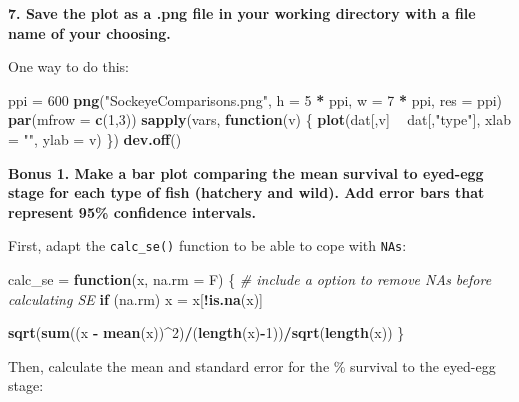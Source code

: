 \documentclass[]{book}
\newenvironment{Shaded}{\begin{snugshade}}{\end{snugshade}}
\newcommand{\KeywordTok}[1]{\textcolor[rgb]{0.13,0.29,0.53}{\textbf{#1}}}
\newcommand{\DataTypeTok}[1]{\textcolor[rgb]{0.13,0.29,0.53}{#1}}
\newcommand{\DecValTok}[1]{\textcolor[rgb]{0.00,0.00,0.81}{#1}}
\newcommand{\StringTok}[1]{\textcolor[rgb]{0.31,0.60,0.02}{#1}}
\newcommand{\CommentTok}[1]{\textcolor[rgb]{0.56,0.35,0.01}{\textit{#1}}}
\newcommand{\ControlFlowTok}[1]{\textcolor[rgb]{0.13,0.29,0.53}{\textbf{#1}}}
\newcommand{\OperatorTok}[1]{\textcolor[rgb]{0.81,0.36,0.00}{\textbf{#1}}}
\newcommand{\NormalTok}[1]{#1}
\theoremstyle{definition}
\theoremstyle{definition}
\theoremstyle{definition}
\theoremstyle{remark}
\begin{document}
\textbf{7. Save the plot as a .png file in your working directory with a
file name of your choosing.}

One way to do this:

\begin{Shaded}
\begin{Highlighting}[]
\NormalTok{ppi =}\StringTok{ }\DecValTok{600}
\KeywordTok{png}\NormalTok{(}\StringTok{"SockeyeComparisons.png"}\NormalTok{, }\DataTypeTok{h =} \DecValTok{5} \OperatorTok{*}\StringTok{ }\NormalTok{ppi, }\DataTypeTok{w =} \DecValTok{7} \OperatorTok{*}\StringTok{ }\NormalTok{ppi, }\DataTypeTok{res =}\NormalTok{ ppi)}
\KeywordTok{par}\NormalTok{(}\DataTypeTok{mfrow =} \KeywordTok{c}\NormalTok{(}\DecValTok{1}\NormalTok{,}\DecValTok{3}\NormalTok{))}
\KeywordTok{sapply}\NormalTok{(vars, }\ControlFlowTok{function}\NormalTok{(v) \{}
  \KeywordTok{plot}\NormalTok{(dat[,v] }\OperatorTok{~}\StringTok{ }\NormalTok{dat[,}\StringTok{"type"}\NormalTok{], }\DataTypeTok{xlab =} \StringTok{""}\NormalTok{, }\DataTypeTok{ylab =}\NormalTok{ v)}
\NormalTok{\})}
\KeywordTok{dev.off}\NormalTok{()}
\end{Highlighting}
\end{Shaded}

\textbf{Bonus 1. Make a bar plot comparing the mean survival to eyed-egg
stage for each type of fish (hatchery and wild). Add error bars that
represent 95\% confidence intervals.}

First, adapt the \texttt{calc\_se()} function to be able to cope with
\texttt{NAs}:

\begin{Shaded}
\begin{Highlighting}[]
\NormalTok{calc_se =}\StringTok{ }\ControlFlowTok{function}\NormalTok{(x, }\DataTypeTok{na.rm =}\NormalTok{ F) \{}
  \CommentTok{# include a option to remove NAs before calculating SE}
  \ControlFlowTok{if}\NormalTok{ (na.rm) x =}\StringTok{ }\NormalTok{x[}\OperatorTok{!}\KeywordTok{is.na}\NormalTok{(x)]}
  
  \KeywordTok{sqrt}\NormalTok{(}\KeywordTok{sum}\NormalTok{((x }\OperatorTok{-}\StringTok{ }\KeywordTok{mean}\NormalTok{(x))}\OperatorTok{^}\DecValTok{2}\NormalTok{)}\OperatorTok{/}\NormalTok{(}\KeywordTok{length}\NormalTok{(x)}\OperatorTok{-}\DecValTok{1}\NormalTok{))}\OperatorTok{/}\KeywordTok{sqrt}\NormalTok{(}\KeywordTok{length}\NormalTok{(x))}
\NormalTok{\}}
\end{Highlighting}
\end{Shaded}

Then, calculate the mean and standard error for the \% survival to the
eyed-egg stage:
\end{document}
